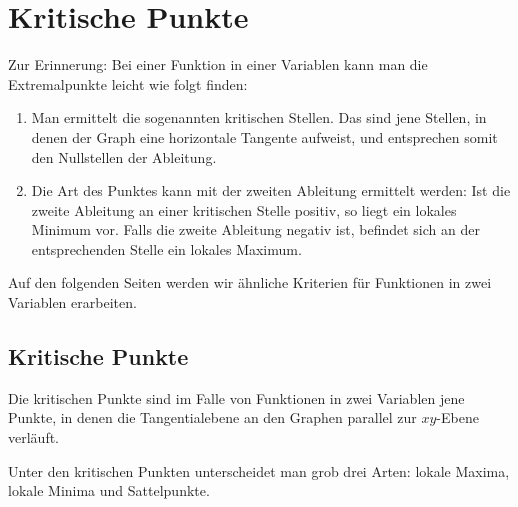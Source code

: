 \section{Kritische Punkte}
\label{sec:kritischePunkte}

Zur Erinnerung: Bei einer Funktion in einer Variablen kann man die Extremalpunkte leicht wie folgt finden:
\begin{enumerate}
	\item Man ermittelt die sogenannten kritischen Stellen. Das sind jene Stellen, in denen der Graph eine horizontale Tangente aufweist, und entsprechen somit den Nullstellen der Ableitung.
	\item Die Art des Punktes kann mit der zweiten Ableitung ermittelt werden: Ist die zweite Ableitung an einer kritischen Stelle positiv, so liegt ein lokales Minimum vor. Falls die zweite Ableitung negativ ist, befindet sich an der entsprechenden Stelle ein lokales Maximum.
\end{enumerate}
Auf den folgenden Seiten werden wir ähnliche Kriterien für Funktionen in zwei Variablen erarbeiten.

\subsection{Kritische Punkte}

Die kritischen Punkte sind im Falle von Funktionen in zwei Variablen jene Punkte, in denen die Tangentialebene an den Graphen parallel zur $xy$-Ebene verläuft.
\begin{center}
\end{center}

Unter den kritischen Punkten unterscheidet man grob drei Arten: lokale Maxima, lokale Minima und Sattelpunkte.

